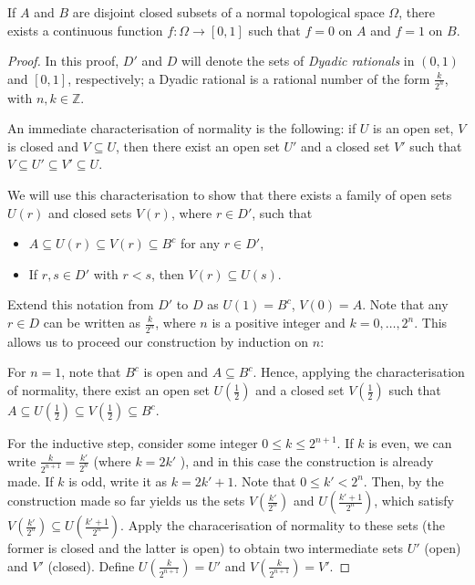 \begin{thrm}\label{Urysohn}
		If \(A\) and \(B\) are disjoint closed subsets of a normal topological space \(\Omega\), there exists a continuous function \(f\colon \Omega\to \left[0,1\right]\) such that \(f=0\) on \(A\) and \(f=1\) on \(B\).
\end{thrm}
\begin{proof}
		In this proof, \(D'\) and \(D\) will denote the sets of \emph{Dyadic rationals} in \((0,1)\) and \([0,1]\), respectively; a Dyadic rational is a rational number of the form \(\frac{k}{2^n}\), with \(n,k\in\mathbb{Z}\). 

		An immediate characterisation of normality is the following: if \(U\) is an open set, \(V\) is closed and \(V\subseteq U\), then there exist an open set \(U'\) and a closed set \(V'\) such that \(V\subseteq U'\subseteq V'\subseteq U\).

		We will use this characterisation to show that there exists a family of open sets \(U(r)\) and closed sets \(V(r)\), where \(r\in D'\), such that
		\begin{itemize}
				\item \(A\subseteq U(r)\subseteq V(r)\subseteq B^c\) for any \(r\in D'\),
				\item If \(r,s\in D'\) with \(r<s\), then \(V(r)\subseteq U(s)\).
		\end{itemize}
		Extend this notation from \(D'\) to \(D\) as \(U(1)=B^c\), \(V(0)=A\). Note that any \(r\in D\) can be written as \(\frac{k}{2^n}\), where \(n\) is a positive integer and \(k=0,\dots,2^n\). This allows us to proceed our construction by induction on \(n\):

		For \(n=1\), note that \(B^c\) is open and \(A\subseteq B^c\). Hence, applying the characterisation of normality, there exist an open set \(U\left(\frac{1}{2}\right)\) and a closed set \(V\left(\frac{1}{2}\right)\) such that \(A\subseteq U\left(\frac{1}{2}\right)\subseteq V\left(\frac{1}{2}\right)\subseteq B^c\).

		For the inductive step, consider some  integer \(0\leq k\leq 2^{n+1}\). If \(k\) is even, we can write \(\frac{k}{2^{n+1}}=\frac{k'}{2^n}\) (where \(k=2k'\) ), and in this case the construction is already made. If \(k\) is odd, write it as \(k=2k'+1\). Note that \(0\leq k'< 2^n\). Then, by the construction made so far yields us the sets \(V\left(\frac{k'}{2^n}\right)\) and \(U\left(\frac{k'+1}{2^n}\right)\), which satisfy \(V\left(\frac{k'}{2^n}\right)\subseteq U\left(\frac{k'+1}{2^n}\right)\). Apply the characerisation of normality to these sets (the former is closed and the latter is open) to obtain two intermediate sets \(U'\) (open) and \(V'\) (closed). Define \(U\left(\frac{k}{2^{n+1}}\right)=U'\) and \(V\left(\frac{k}{2^{n+1}}\right)=V'\).


\end{proof}
